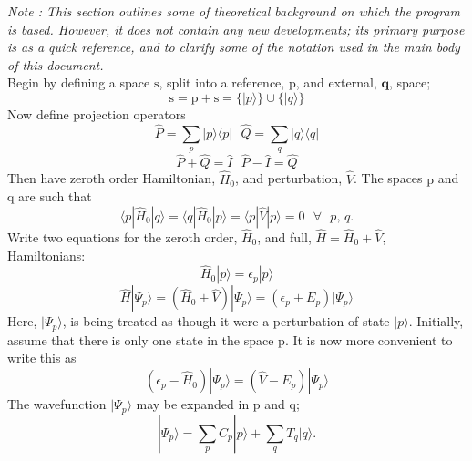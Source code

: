 \emph{Note : This section outlines some of theoretical background on which the program is based.
However, it does not contain any new developments; its primary purpose is as a quick reference,
and to clarify some of the notation used in the main body of this document.}\\

\noindent Begin by defining a space $\mathrm{s}$, split into a reference, $\mathrm{p}$, and external, $\mathbf{q}$, space;
\begin{equation}
\mathrm{s} = \mathrm{p} + \mathrm{s} = \{ |p\rangle \} \cup \{|q\rangle \}
\end{equation}
Now define projection operators
\begin{equation}
\hat{P} =\sum_{p} |p\rangle \langle p | 
\text{ \ \ \ \ \ \ \ \ \ }
\hat{Q} =\sum_{q} |q\rangle \langle q | 
\end{equation}
\begin{equation}
\hat{P}+\hat{Q} = \hat{I}
\text{\ \ \ \ \ \ \ \ \ }
\hat{P}-\hat{I} = \hat{Q}
\end{equation}
Then have zeroth order Hamiltonian, $\hat{H}_{0}$, and perturbation, $\hat{V}$. The spaces $\mathrm{p}$ and $\mathrm{q}$ are such that
\begin{equation}
\langle p | \hat{H}_{0} | q \rangle  = 
\langle q | \hat{H}_{0} | p \rangle  = 
\langle p | \hat{V} | p \rangle  =  0 \text{ \ \ \ } \forall \text{ \ }p\text{,\ }q  . 
\label{eqn:space_props}
\end{equation}
Write two equations for the zeroth order, $\hat{H}_{0}$, and full, $\hat{H} = \hat{H}_{0} + \hat{V}$, Hamiltonians:
\begin{equation}
\hat{H}_{0} | p \rangle  = \epsilon_{p} |p \rangle
\end{equation}
\begin{equation}
\hat{H}|\Psi_{p} \rangle =( \hat{H}_{0}+\hat{V} )| \Psi_{p} \rangle  = (\epsilon_{p}+E_{p})|\Psi_{p} \rangle
\end{equation}
Here, $|\Psi_{p}\rangle$, is being treated as though it were a perturbation of state $|p\rangle$. Initially, 
assume that there is only one state in the space $\mathrm{p}$. It is now more convenient to write this as
\begin{equation}
(\epsilon_{p}-\hat{H}_{0} )| \Psi_{p} \rangle  = (\hat{V}-E_{p})|\Psi_{p} \rangle
\end{equation}
The wavefunction $|\Psi_{p} \rangle$ may be expanded in $\mathrm{p}$ and $\mathrm{q}$;
\begin{equation}
| \Psi_{p} \rangle  = \sum_{p} C_{p}|p\rangle + \sum_{q} T_{q}|q\rangle.
\end{equation}
